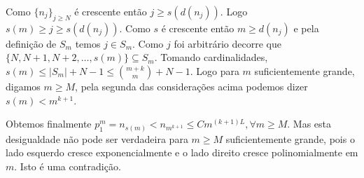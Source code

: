 \documentclass[repertorio-solutions-1.tex]{subfiles}
\newcommand*{\nj}{\ensuremath{\{n_j\}_{j\geq N}}}
\renewcommand*{\=}[1]{\ensuremath{\stackrel{\text{#1}}{=}}}
\begin{document}
\begin{solution}
Como $\nj$ é crescente então $j\geq s(d(n_j))$.
Logo $s(m)\geq j\geq s(d(n_j))$.
Como $s$ é crescente então $m\geq d(n_j)$ e pela definição de $S_m$
temos $j\in S_m$.
Como $j$ foi arbitrário decorre que $\{N,N+1,N+2,\dots,s(m)\}\subseteq S_m$.
Tomando cardinalidades, $s(m)\leq |S_m|+N-1\leq\binom{m+k}{m}+N-1$.
Logo para $m$ suficientemente grande, digamos $m\geq M$,
pela segunda das considerações acima podemos dizer $s(m)<m^{k+1}$.

Obtemos finalmente $p_1^m=n_{s(m)}<n_{m^{k+1}}\leq Cm^{(k+1)L},\forall m\geq M$.
Mas esta desigualdade não pode ser verdadeira para $m\geq M$ suficientemente
grande, pois o lado esquerdo cresce exponencialmente e o lado direito
cresce polinomialmente em $m$. Isto é uma contradição.
\end{solution}
\end{document}
